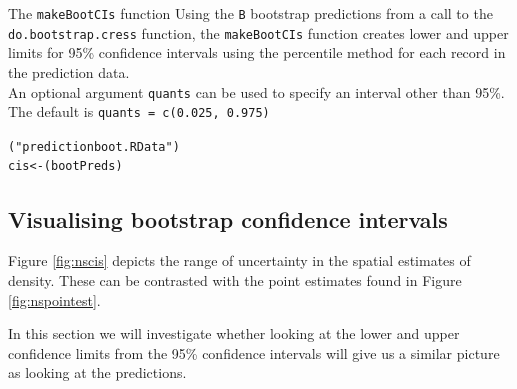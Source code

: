 \begin{block}{The {\tt makeBootCIs} function}
Using the {\tt B} bootstrap predictions from a call to the {\tt do.bootstrap.cress} function, the {\tt makeBootCIs} function creates lower and upper limits for 95\% confidence intervals using the percentile method for each record in the prediction data. \\

\noindent An optional argument {\tt quants} can be used to specify an interval other than 95\%.  The default is {\tt quants = c(0.025, 0.975)}
\end{block}

\begin{knitrout}\footnotesize
{}\color{fgcolor}\begin{kframe}
\begin{alltt}
("predictionboot.RData")
cis <- (bootPreds)
\end{alltt}
\end{kframe}
\end{knitrout}


\subsection{Visualising bootstrap confidence intervals}

Figure \ref{fig:nscis} depicts the range of uncertainty in the spatial estimates of density.  These can be contrasted with the point estimates found in Figure \ref{fig:nspointest}.

In this section we will investigate whether looking at the lower and upper confidence limits from the 95\% confidence intervals will give us a similar picture as looking at the predictions. 


